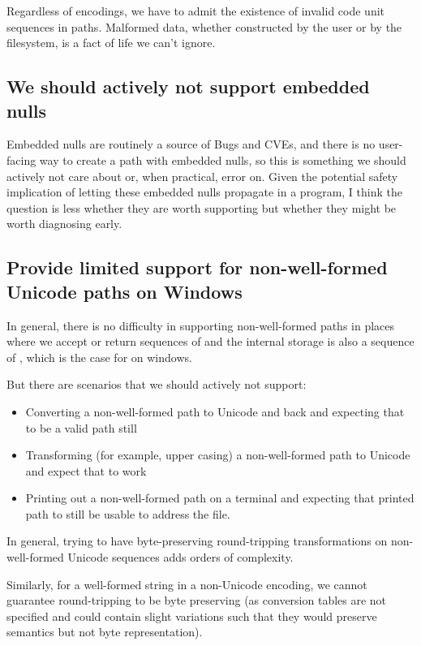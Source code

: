 \documentclass{wg21}
\begin{document}
Regardless of encodings, we have to admit the existence of invalid code unit sequences in paths.
Malformed data, whether constructed by the user or by the filesystem, is a fact of life we can't ignore.

\subsection{We should actively not support embedded nulls}

Embedded nulls are routinely a source of Bugs and CVEs, and there is no user-facing way to create a path with embedded nulls,
so this is something we should actively not care about or, when practical, error on.
Given the potential safety implication of letting these embedded nulls propagate in a program, I think the question is less whether they are worth supporting but whether they might be worth diagnosing early.

\subsection{Provide limited support for non-well-formed Unicode paths on Windows}

In general, there is no difficulty in supporting non-well-formed paths in places where we accept or return sequences of 
and the internal storage is also a sequence of , which is the case for  on windows.

But there are scenarios that we should actively not support:
\begin{itemize}
\item Converting a non-well-formed path to Unicode and back and expecting that to be a valid path still
\item Transforming (for example, upper casing) a non-well-formed path to Unicode and expect that to work
\item Printing out a non-well-formed path on a terminal and expecting that printed path to still be usable to address the file.
\end{itemize}

In general, trying to have byte-preserving round-tripping transformations on non-well-formed Unicode sequences adds orders of complexity.

Similarly, for a well-formed string in a non-Unicode encoding, we cannot guarantee round-tripping to be byte preserving (as conversion tables are not specified and could contain slight variations such that they would preserve semantics but not byte representation).
\end{document}
